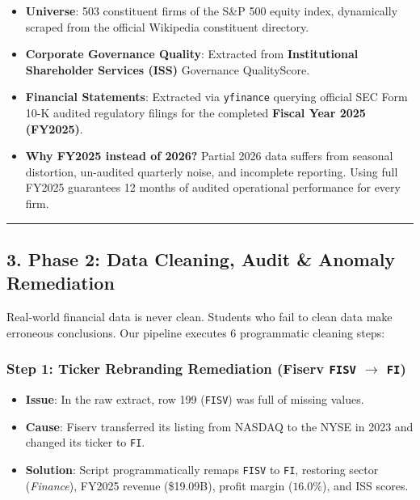 \documentclass[
]{article}
\providecommand{\tightlist}{%
  \setlength{\itemsep}{0pt}\setlength{\parskip}{0pt}}
\begin{document}
\begin{itemize}
\tightlist
\item
  \textbf{Universe}: 503 constituent firms of the S\&P 500 equity index,
  dynamically scraped from the official Wikipedia constituent directory.
\item
  \textbf{Corporate Governance Quality}: Extracted from
  \textbf{Institutional Shareholder Services (ISS)} Governance
  QualityScore.
\item
  \textbf{Financial Statements}: Extracted via \texttt{yfinance}
  querying official SEC Form 10-K audited regulatory filings for the
  completed \textbf{Fiscal Year 2025 (FY2025)}.
\item
  \textbf{Why FY2025 instead of 2026?} Partial 2026 data suffers from
  seasonal distortion, un-audited quarterly noise, and incomplete
  reporting. Using full FY2025 guarantees 12 months of audited
  operational performance for every firm.
\end{itemize}

\begin{center}\rule{0.5\linewidth}{0.5pt}\end{center}

\subsection{3. Phase 2: Data Cleaning, Audit \& Anomaly
Remediation}\label{phase-2-data-cleaning-audit-anomaly-remediation}

Real-world financial data is never clean. Students who fail to clean
data make erroneous conclusions. Our pipeline executes 6 programmatic
cleaning steps:

\subsubsection{\texorpdfstring{Step 1: Ticker Rebranding Remediation
(Fiserv \texttt{FISV} \(\rightarrow\)
\texttt{FI})}{Step 1: Ticker Rebranding Remediation (Fiserv FISV \textbackslash rightarrow FI)}}\label{step-1-ticker-rebranding-remediation-fiserv-fisv-rightarrow-fi}

\begin{itemize}
\tightlist
\item
  \textbf{Issue}: In the raw extract, row 199 (\texttt{FISV}) was full
  of missing values.
\item
  \textbf{Cause}: Fiserv transferred its listing from NASDAQ to the NYSE
  in 2023 and changed its ticker to \texttt{FI}.
\item
  \textbf{Solution}: Script programmatically remaps \texttt{FISV} to
  \texttt{FI}, restoring sector (\emph{Finance}), FY2025 revenue
  (\$19.09B), profit margin (\(16.0\%\)), and ISS scores.
\end{itemize}
\end{document}
